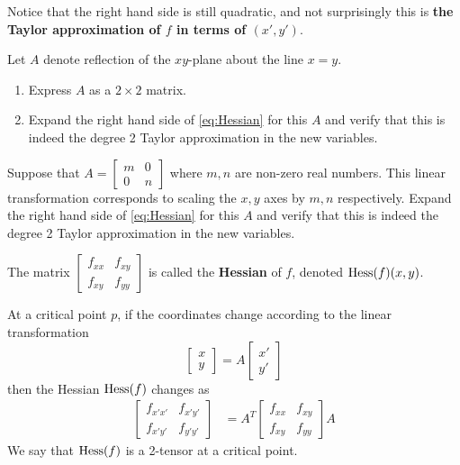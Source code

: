 Notice that the right hand side is still quadratic, and not surprisingly this is \textbf{the Taylor approximation of $ f$ in terms of $ (x',y')$}.
\begin{ques}
  Let $A$ denote reflection of the $xy$-plane about the line $x=y$.
  \begin{enumerate}
    \item Express $A$ as a $2 \times 2$ matrix.
    \item Expand the right hand side of \eqref{eq:Hessian} for this $A$ and verify that this is indeed the degree 2 Taylor approximation in the new variables.
  \end{enumerate}
\end{ques}
\begin{ques}
  Suppose that $A = \begin{bmatrix} m & 0 \\ 0 & n \end{bmatrix}$ where $m,n$ are non-zero real numbers. This linear transformation corresponds to scaling the $x,y$ axes by $m,n$ respectively. Expand the right hand side of \eqref{eq:Hessian} for this $A$ and verify that this is indeed the degree 2 Taylor approximation in the new variables.
\end{ques}
\begin{definition}
  The matrix $\begin{bmatrix} f_{xx} & f_{xy} \\ f_{xy} & f_{yy} \end{bmatrix}$ is called the \textbf{Hessian} of $ f$, denoted $ \operatorname{Hess}(f)(x,y)$.
\end{definition}
\begin{thm}
  \label{thm:change_of_coords_Hessian}
  At a critical point $p$, if the coordinates change according to the linear transformation $$\begin{bmatrix} x \\ y \end{bmatrix} = A \begin{bmatrix} x' \\ y' \end{bmatrix}$$ then the Hessian $ \operatorname{Hess}(f)$ changes as
  \begin{align}
    \label{eq:2-tensor}
    \begin{bmatrix}
      f_{x'x'} & f_{x'y'} \\
      f_{x'y'} & f_{y'y'}
    \end{bmatrix}
      &=
       A^T
      \begin{bmatrix}
        f_{xx} & f_{xy} \\
        f_{xy} & f_{yy}
      \end{bmatrix}
      A
  \end{align}
  We say that $\operatorname{Hess}(f)$ is a 2-tensor at a critical point.
\end{thm}
